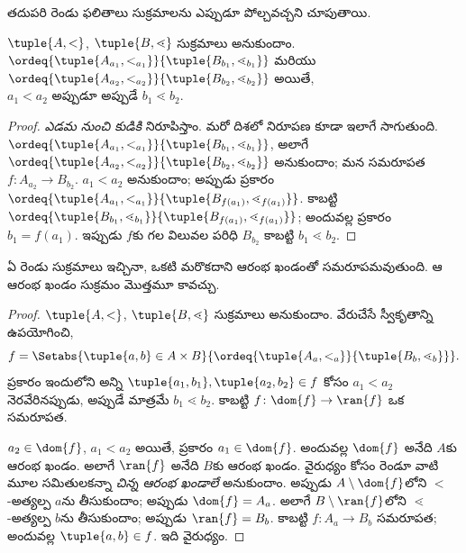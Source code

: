 \documentclass[../../../include/open-logic-section]{subfiles}
\begin{document}
తదుపరి రెండు ఫలితాలు
సుక్రమాలను ఎప్పుడూ
పోల్చవచ్చని చూపుతాయి.

\begin{lem}
$\tuple{A, <}$,
$\tuple{B, \lessdot}$
సుక్రమాలు అనుకుందాం.
$\ordeq{\tuple{A_{a_1}, <_{a_1}}}{\tuple{B_{b_1}, \lessdot_{b_1}}}$
మరియు $\ordeq{\tuple{A_{{a_2}}, <_{a_2}}}{\tuple{B_{{b_2}},
\lessdot_{b_2}}}$ అయితే,
${a_1}  < {a_2} \text{ అప్పుడూ అప్పుడే }{b_1} \lessdot
{b_2}$.
\end{lem}

\begin{proof}
\emph{ఎడమ నుంచి కుడికి}
నిరూపిస్తాం. మరో దిశలో నిరూపణ
కూడా ఇలాగే సాగుతుంది.
$\ordeq{\tuple{A_{a_1}, <_{a_1}}}{\tuple{B_{b_1},
\lessdot_{b_1}}}$, అలాగే
$\ordeq{\tuple{A_{{a_2}},
<_{a_2}}}{\tuple{B_{{b_2}}, \lessdot_{b_2}}}$
అనుకుందాం; మన సమరూపత
$f \colon
A_{{a_2}} \to B_{{b_2}}$.
${a_1} < {a_2}$ అనుకుందాం;
అప్పుడు
ప్రకారం
$\ordeq{\tuple{A_{a_1}, <_{a_1}}}{\tuple{B_{f({a_1})},
\lessdot_{f({a_1})}}}$.
కాబట్టి
$\ordeq{\tuple{B_{b_1}, \lessdot_{b_1}}}{\tuple{B_{f({a_1})},
\lessdot_{f({a_1})}}}$;
అందువల్ల
ప్రకారం
${b_1} = f({a_1})$.
ఇప్పుడు $f$కు గల
విలువల పరిధి $B_{{b_2}}$
కాబట్టి ${b_1} \lessdot {b_2}$.
\end{proof}

\begin{thm}
ఏ రెండు సుక్రమాలు ఇచ్చినా,
ఒకటి మరొకదాని
ఆరంభ ఖండంతో సమరూపమవుతుంది.
ఆ ఆరంభ ఖండం సుక్రమం మొత్తమూ కావచ్చు.
\end{thm}

\begin{proof}
$\tuple{A, <}$,
$\tuple{B, \lessdot}$
సుక్రమాలు అనుకుందాం.
వేరుచేసే స్వీకృతాన్ని ఉపయోగించి,
\[
	f = \Setabs{\tuple{a, b} \in A \times B}{
		\ordeq{\tuple{A_a, <_a}}{\tuple{B_b, \lessdot_b}}}.
\]
ప్రకారం ఇందులోని
అన్ని $\tuple{a_1, b_1}, \tuple{a_2, b_2} \in f$
కోసం $a_1 < a_2$
నెరవేరినప్పుడు, అప్పుడే మాత్రమే
$b_1 \lessdot b_2$.
కాబట్టి
$f \colon \dom{f} \to
\ran{f}$ ఒక సమరూపత.

$a_2 \in \dom{f}$,
$a_1 < a_2$ అయితే,
ప్రకారం $a_1 \in \dom{f}$.
అందువల్ల $\dom{f}$ అనేది
$A$కు ఆరంభ ఖండం. అలాగే
$\ran{f}$ అనేది $B$కు ఆరంభ ఖండం.
వైరుధ్యం కోసం రెండూ వాటి మూల సమితులకన్నా
\emph{చిన్న ఆరంభ ఖండాలే} అనుకుందాం.
అప్పుడు $A \setminus \dom{f}$లోని
$<$-అత్యల్ప
$a$ను తీసుకుందాం;
అప్పుడు $\dom{f} =
A_a$. అలాగే
$B \setminus
\ran{f}$లోని
$\lessdot$-అత్యల్ప
$b$ను తీసుకుందాం;
అప్పుడు $\ran{f} = B_b$.
కాబట్టి
$f \colon A_a \to B_b$
సమరూపత; అందువల్ల
$\tuple{a, b} \in f$.
ఇది వైరుధ్యం.
\end{proof}
\end{document}
